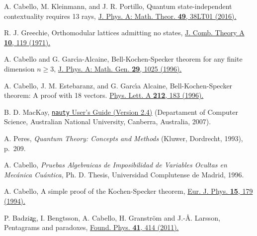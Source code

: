 \documentclass[%
 twocolumn,
 groupedaddress,
 showpacs,
 showkeys,
 preprintnumbers,
 amsmath,amssymb,
 aps,
 pra,
 longbibliography,
 floatfix,
 ]{revtex4-1}
\begin{document}
\begin{thebibliography}{99}
A. Cabello, M. Kleinmann, and J. R. Portillo,
Quantum state-independent contextuality requires 13 rays,
\href{http://dx.doi.org/10.1088/1751-8113/49/38/38LT01}{J. Phys. A: Math. Theor. \textbf{49}, 38LT01 (2016).}

R. J. Greechie,
Orthomodular lattices admitting no states,
\href{https://doi.org/10.1016/0097-3165(71)90015-X}{J. Comb. Theory A \textbf{10}, 119 (1971).}


A. Cabello and G. Garc\'{\i}a-Alcaine,
Bell-Kochen-Specker theorem for any finite dimension $n \ge 3$,
\href{http://dx.doi.org/10.1088/0305-4470/29/5/016}{J. Phys. A: Math. Gen. \textbf{29}, 1025 (1996).}
	
 A. Cabello, J. M. Estebaranz, and G. Garc\'{\i}a Alcaine,
 Bell-Kochen-Specker theorem: A proof with 18 vectors.
 \href{http://dx.doi.org/10.1016/0375-9601(96)00134-X}{Phys. Lett. A \textbf{212}, 183 (1996).}


 B. D. MacKay,
 \href{http://cs.anu.edu.au/~Brendan.McKay/nauty/nug.pdf}{\texttt{nauty} User's Guide (Version 2.4)}
 (Departament of Computer Science, Australian National University, Canberra, Australia, 2007).

 A. Peres, 
 \emph{Quantum Theory: Concepts and Methods} (Kluwer, Dordrecht, 1993), p.~209.

 
 A. Cabello,
 \emph{Pruebas Algebraicas de Imposibilidad de Variables Ocultas en Mec{\'a}nica Cu{\'a}ntica}, Ph. D. Thesis, Universidad Complutense de Madrid, 1996.

A. Cabello,
A simple proof of the Kochen-Specker theorem,
\href{https://doi.org/10.1088/0143-0807/15/4/004}{Eur. J. Phys. \textbf{15}, 179 (1994).}

P. Badzi{\c a}g, I. Bengtsson, A. Cabello, H. Granstr\"om and J.-\AA. Larsson,
Pentagrams and paradoxes,
\href{https://doi.org/10.1007/s10701-010-9433-3}{Found. Phys. \textbf{41}, 414 (2011).}



\end{thebibliography}
\end{document}
